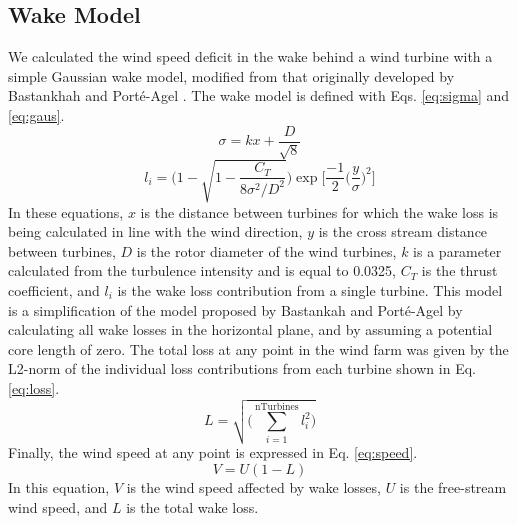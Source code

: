 \documentclass[wes, manuscript]{copernicus}
\begin{document}
\subsection{Wake Model}
We calculated the wind speed deficit in the wake behind a wind turbine with a simple Gaussian wake model, modified from that originally developed by Bastankhah and Port\'e-Agel \citep{bastankhah2016experimental,Baker2019}. The wake model is defined with Eqs. \ref{eq:sigma} and \ref{eq:gaus}.
%
\begin{equation}
\sigma = kx+\frac{D}{\sqrt{8}}
\label{eq:sigma}
\end{equation}
%
\begin{equation}
l_i = \Bigg(1-\sqrt{1-\frac{C_T}{8\sigma^2/D^2}}\Bigg)\exp{\Big[\frac{-1}{2}\Big(\frac{y}{\sigma}\Big)^2\Big]}
\label{eq:gaus}
\end{equation}
%
In these equations, $x$ is the distance between turbines for which the wake loss is being calculated in line with the wind direction, $y$ is the cross stream distance between turbines, $D$ is the rotor diameter of the wind turbines, $k$ is a parameter calculated from the turbulence intensity and is equal to 0.0325, $C_T$ is the thrust coefficient, and $l_i$ is the wake loss contribution from a single turbine. This model is a simplification of the model proposed by Bastankah and Port\'e-Agel by calculating all wake losses in the horizontal plane, and by assuming a potential core length of zero.
%
The total loss at any point in the wind farm was given by the L2-norm of the individual loss contributions from each turbine shown in Eq. \ref{eq:loss}.
%
\begin{equation}
L = \sqrt{\Bigg(\sum_{i=1}^\text{nTurbines}l_i^2\Bigg)}
\label{eq:loss}
\end{equation}
%
Finally, the wind speed at any point is expressed in Eq. \ref{eq:speed}.
%
\begin{equation}
V = U(1-L)
\label{eq:speed}
\end{equation}
%
In this equation, $V$ is the wind speed affected by wake losses, $U$ is the free-stream wind speed, and $L$ is the total wake loss.
\end{document}
